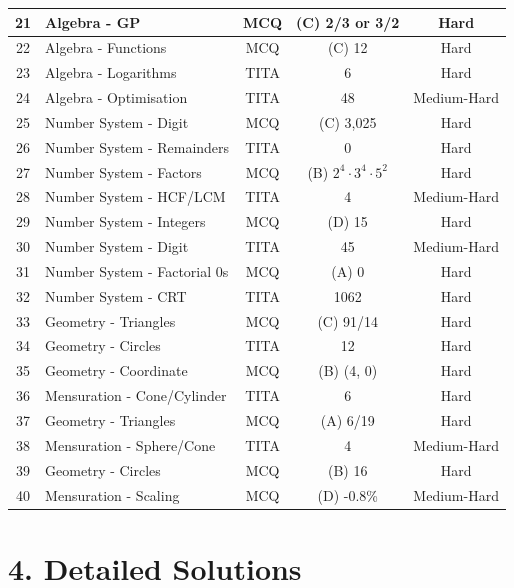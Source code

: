 \documentclass[11pt]{article}
\begin{document}
\begin{longtable}{|c|l|c|c|c|}
21 & Algebra - GP                    & MCQ  & (C) 2/3 or 3/2 & Hard \\ \hline
22 & Algebra - Functions             & MCQ  & (C) 12         & Hard \\ \hline
23 & Algebra - Logarithms            & TITA & 6              & Hard \\ \hline
24 & Algebra - Optimisation          & TITA & 48             & Medium-Hard \\ \hline
25 & Number System - Digit           & MCQ  & (C) 3{,}025    & Hard \\ \hline
26 & Number System - Remainders      & TITA & 0              & Hard \\ \hline
27 & Number System - Factors         & MCQ  & (B) \(2^{4}\cdot 3^{4}\cdot 5^{2}\) & Hard \\ \hline
28 & Number System - HCF/LCM         & TITA & 4              & Medium-Hard \\ \hline
29 & Number System - Integers        & MCQ  & (D) 15         & Hard \\ \hline
30 & Number System - Digit           & TITA & 45             & Medium-Hard \\ \hline
31 & Number System - Factorial 0s    & MCQ  & (A) 0          & Hard \\ \hline
32 & Number System - CRT             & TITA & 1062           & Hard \\ \hline
33 & Geometry - Triangles            & MCQ  & (C) 91/14      & Hard \\ \hline
34 & Geometry - Circles              & TITA & 12             & Hard \\ \hline
35 & Geometry - Coordinate           & MCQ  & (B) (4, 0)     & Hard \\ \hline
36 & Mensuration - Cone/Cylinder     & TITA & 6              & Hard \\ \hline
37 & Geometry - Triangles            & MCQ  & (A) 6/19       & Hard \\ \hline
38 & Mensuration - Sphere/Cone       & TITA & 4              & Medium-Hard \\ \hline
39 & Geometry - Circles              & MCQ  & (B) 16         & Hard \\ \hline
40 & Mensuration - Scaling           & MCQ  & (D) -0.8\%     & Medium-Hard \\ \hline
\end{longtable}

\newpage
\section*{4. Detailed Solutions}
\end{document}

